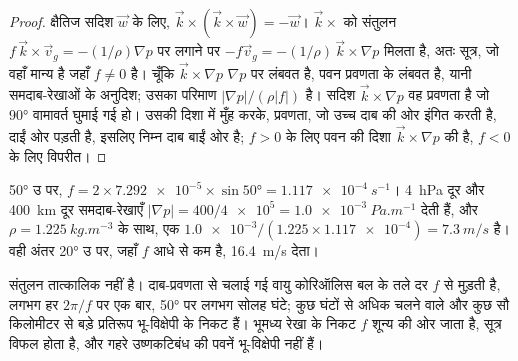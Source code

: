 \begin{proof}
क्षैतिज सदिश $\vec w$ के लिए, $\vec k\times(\vec k\times\vec w) = -\vec w$।
$\vec k\times$ को संतुलन $f\,\vec k\times\vec v_g = -(1/\rho)\nabla p$ पर लगाने पर
$-f\vec v_g = -(1/\rho)\,\vec k\times\nabla p$ मिलता है, अतः सूत्र, जो वहाँ मान्य है जहाँ
$f \neq 0$ है। चूँकि $\vec k\times\nabla p$ $\nabla p$ पर लंबवत है, पवन प्रवणता के लंबवत है, यानी समदाब-रेखाओं के अनुदिश; उसका परिमाण $|\nabla
p|/(\rho|f|)$ है। सदिश $\vec k\times\nabla p$ वह प्रवणता है जो \ang{90} वामावर्त घुमाई गई हो। उसकी दिशा में मुँह करके, प्रवणता, जो उच्च दाब की ओर इंगित करती है, दाईं ओर पड़ती है, इसलिए निम्न दाब बाईं ओर है; $f > 0$ के लिए पवन की दिशा $\vec k\times\nabla p$ की है, $f < 0$ के लिए विपरीत।
\end{proof}

\begin{example}\label{ex:b1:atmospheric-circulation:geostrophic}
\ang{50} उ पर, $f = 2 \times \num{7.292e-5} \times \sin\ang{50} = \qty{1.117e-4}{s^{-1}}$।
\qty{4}{hPa} दूर और \qty{400}{km} दूर समदाब-रेखाएँ $|\nabla p| = 400/\num{4e5} =
\qty{1.0e-3}{Pa.m^{-1}}$ देती हैं, और $\rho = \qty{1.225}{kg.m^{-3}}$ के साथ, एक  $\num{1.0e-3}/(1.225 \times \num{1.117e-4}) = \qty{7.3}{m/s}$ है। वही अंतर \ang{20} उ पर, जहाँ $f$ आधे से कम है, \qty{16.4}{m/s} देता।
\end{example}

संतुलन तात्कालिक नहीं है। दाब-प्रवणता से चलाई गई वायु कोरिऑलिस बल के तले दर $f$ से मुड़ती है, लगभग हर $2\pi/f$ पर एक बार, \ang{50} पर लगभग सोलह घंटे; कुछ घंटों से अधिक चलने वाले और कुछ सौ किलोमीटर से बड़े प्रतिरूप भू-विक्षेपी के निकट हैं। भूमध्य रेखा के निकट $f$ शून्य की ओर जाता है, सूत्र विफल होता है, और गहरे उष्णकटिबंध की पवनें भू-विक्षेपी नहीं हैं।

